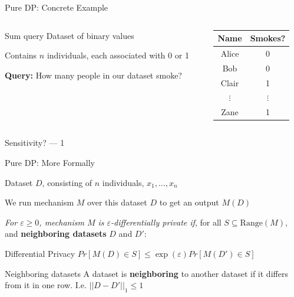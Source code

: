 \documentclass[12pt,aspectratio=169]{beamer}
\begin{document}
\begin{frame}{Pure DP: Concrete Example}

\begin{columns}[T]

\begin{column}{.5\textwidth}

\begin{block}{Sum query}
Dataset of binary values

Contains $n$ individuals, each associated with 0 or 1

\textbf{Query:} How many people in our dataset smoke?
\end{block}

\end{column}

\begin{column}{.5\textwidth}

\begin{table}[]
    \centering
    \begin{tabular}{c|c}
    Name    &   Smokes?\\
    \hline
    Alice     &  0\\
    Bob     & 0\\
    Clair     & 1\\
    $\vdots$    & $\vdots$\\
    Zane    &   1\\
    \end{tabular}
\end{table}

\end{column}
\end{columns}

\vspace{5mm}

Sensitivity? --- 1

\end{frame}


\begin{frame}{Pure DP: More Formally}

Dataset $D$, consisting of $n$ individuals, $x_1, \dots, x_n$

We run mechanism $M$ over this dataset $D$ to get an output $M(D)$

\textit{For $\varepsilon \geq 0$, mechanism $M$ is $\varepsilon$-differentially private if}, for all $S \subseteq \text{Range}(M)$, and \textbf{neighboring datasets} $D$ and $D'$:

\vspace{5mm}

\begin{block}{Differential Privacy}
$Pr[M(D) \in S] \leq \exp (\varepsilon) Pr[M(D') \in S]$
\end{block}

\vspace{5mm}

\begin{block}{Neighboring datasets}
  A dataset is \textbf{neighboring} to another dataset if it differs from it in one row.
  I.e. $||D - D'||_1 \leq 1$
\end{block}

\end{frame}
\end{document}

